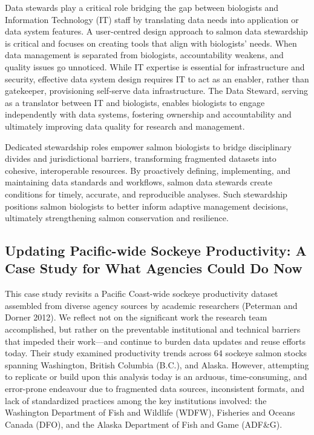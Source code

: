 \documentclass[
  letterpaper,
  DIV=11,
  numbers=noendperiod]{scrartcl}
\begin{document}
Data stewards play a critical role bridging the gap between biologists
and Information Technology (IT) staff by translating data needs into
application or data system features. A user-centred design approach to
salmon data stewardship is critical and focuses on creating tools that
align with biologists' needs. When data management is separated from
biologists, accountability weakens, and quality issues go unnoticed.
While IT expertise is essential for infrastructure and security,
effective data system design requires IT to act as an enabler, rather
than gatekeeper, provisioning self-serve data infrastructure. The Data
Steward, serving as a translator between IT and biologists, enables
biologists to engage independently with data systems, fostering
ownership and accountability and ultimately improving data quality for
research and management.

Dedicated stewardship roles empower salmon biologists to bridge
disciplinary divides and jurisdictional barriers, transforming
fragmented datasets into cohesive, interoperable resources. By
proactively defining, implementing, and maintaining data standards and
workflows, salmon data stewards create conditions for timely, accurate,
and reproducible analyses. Such stewardship positions salmon biologists
to better inform adaptive management decisions, ultimately strengthening
salmon conservation and resilience.

\subsection{Updating Pacific-wide Sockeye Productivity: A Case Study for
What Agencies Could Do
Now}\label{updating-pacific-wide-sockeye-productivity-a-case-study-for-what-agencies-could-do-now}

This case study revisits a Pacific Coast-wide sockeye productivity
dataset assembled from diverse agency sources by academic researchers
(Peterman and Dorner 2012). We reflect not on the significant work the
research team accomplished, but rather on the preventable institutional
and technical barriers that impeded their work---and continue to burden
data updates and reuse efforts today. Their study examined productivity
trends across 64 sockeye salmon stocks spanning Washington, British
Columbia (B.C.), and Alaska. However, attempting to replicate or build
upon this analysis today is an arduous, time-consuming, and error-prone
endeavour due to fragmented data sources, inconsistent formats, and lack
of standardized practices among the key institutions involved: the
Washington Department of Fish and Wildlife (WDFW), Fisheries and Oceans
Canada (DFO), and the Alaska Department of Fish and Game (ADF\&G).
\end{document}
